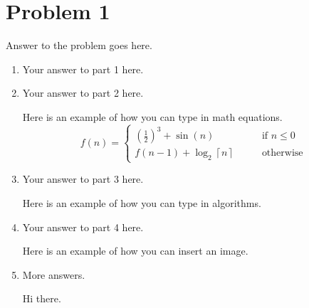 \documentclass[12pt,letterpaper]{article}
\newcommand\pbnumber{1}                    %
\begin{document}
\section*{Problem \pbnumber}

Answer to the problem goes here.

\begin{enumerate}
  \item
    Your answer to part 1 here.
  \item
    Your answer to part 2 here.

    Here is an example of how you can type in math equations.
    \[
      f(n) = \begin{cases}
        \left(\frac{1}{2}\right)^3 + \sin(n) \qquad & \text{if } n \leq 0 \\
        f(n-1) + \log_2 \left\lceil n \right\rceil \qquad & \text{otherwise}
      \end{cases}
    \]
  \item
    Your answer to part 3 here.

    Here is an example of how you can type in algorithms.
  \item
    Your answer to part 4 here.

    Here is an example of how you can insert an image.
  \item
    More answers.

    Hi there.
\end{enumerate}
\end{document}
